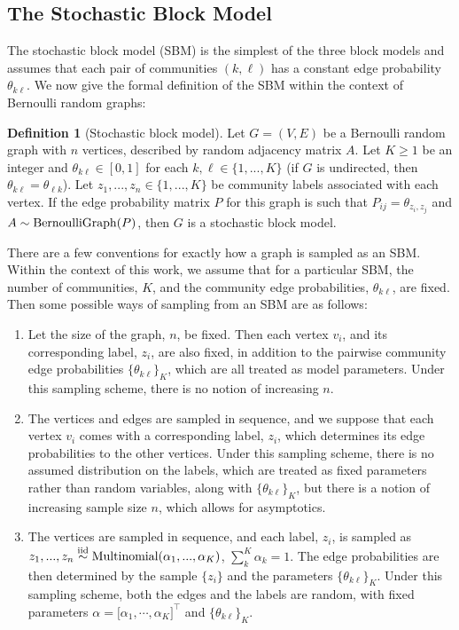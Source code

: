 \documentclass[
  12pt,
]{article}
\providecommand{\tightlist}{%
  \setlength{\itemsep}{0pt}\setlength{\parskip}{0pt}}
\theoremstyle{definition}
\newtheorem{definition}{Definition}[section]
\theoremstyle{definition}
\theoremstyle{definition}
\theoremstyle{definition}
\theoremstyle{remark}
\begin{document}
\hypertarget{sec:sbm}{%
\subsection{The Stochastic Block Model}\label{sec:sbm}}

The stochastic block model (SBM) \citep{doi:10.1080/0022250X.1971.9989788} is the simplest of the three block models and assumes that each pair of communities \((k, \ell)\) has a constant edge probability \(\theta_{k \ell}\).
We now give the formal definition of the SBM within the context of Bernoulli random graphs:

\begin{definition}[Stochastic block model]
\label{def:sbm}
Let $G = (V, E)$ be a Bernoulli random graph with $n$ vertices, described by random adjacency matrix $A$. 
Let $K \geq 1$ be an integer and $\theta_{k \ell} \in [0, 1]$ for each $k, \ell \in \{1, ..., K\}$ (if $G$ is undirected, then $\theta_{k \ell} = \theta_{\ell k}$). 
Let $z_1, ..., z_n \in \{1, ..., K\}$ be community labels associated with each vertex. 
If the edge probability matrix $P$ for this graph is such that 
$P_{ij} = \theta_{z_i, z_j}$ and $A \sim \mathrm{BernoulliGraph}(P)$, then $G$ is a stochastic block model. 
\end{definition}

There are a few conventions for exactly how a graph is sampled as an SBM.
Within the context of this work, we assume that for a particular SBM, the number of communities, \(K\), and the community edge probabilities, \(\theta_{k \ell}\), are fixed.
Then some possible ways of sampling from an SBM are as follows:

\begin{enumerate}
\def\labelenumi{\arabic{enumi}.}
\tightlist
\item
  Let the size of the graph, \(n\), be fixed.
  Then each vertex \(v_i\), and its corresponding label, \(z_i\), are also fixed, in addition to the pairwise community edge probabilities \(\{\theta_{k \ell}\}_K\), which are all treated as model parameters.
  Under this sampling scheme, there is no notion of increasing \(n\).
\item
  The vertices and edges are sampled in sequence, and we suppose that each vertex \(v_i\) comes with a corresponding label, \(z_i\), which determines its edge probabilities to the other vertices.
  Under this sampling scheme, there is no assumed distribution on the labels, which are treated as fixed parameters rather than random variables, along with \(\{\theta_{k \ell}\}_K\), but there is a notion of increasing sample size \(n\), which allows for asymptotics.
\item
  The vertices are sampled in sequence, and each label, \(z_i\), is sampled as \(z_1, ..., z_n \stackrel{\mathrm{iid}}{\sim} \mathrm{Multinomial}(\alpha_1, ..., \alpha_K)\), \(\sum_k^K \alpha_k = 1\).
  The edge probabilities are then determined by the sample \(\{z_i\}\) and the parameters \(\{\theta_{k \ell}\}_K\).
  Under this sampling scheme, both the edges and the labels are random, with fixed parameters \(\alpha = \Big[ \alpha_1, \cdots, \alpha_K \Big]^\top\) and \(\{\theta_{k \ell}\}_K\).
\end{enumerate}
\end{document}

